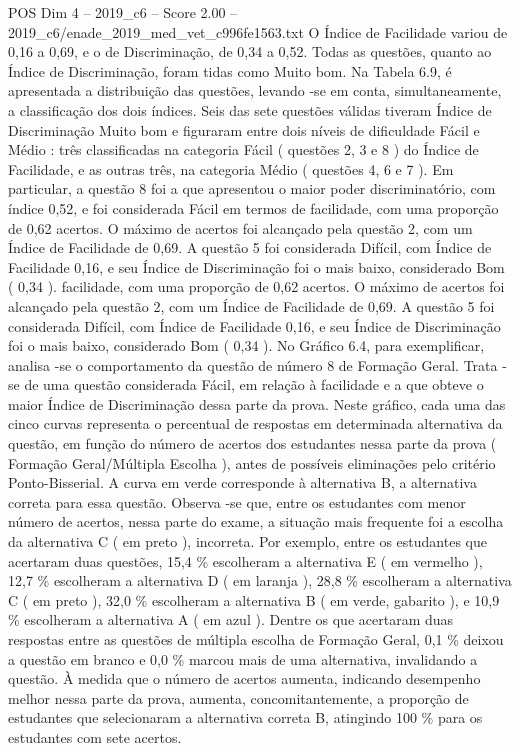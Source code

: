 \begin{textsample}{POS Dim 4 – 2019\_c6 – Score 2.00 – 2019\_c6/enade\_2019\_med\_vet\_c996fe1563.txt}
O Índice de Facilidade variou de 0,16 a 0,69, e o de Discriminação, de 0,34 a 0,52.
Todas as questões, quanto ao Índice de Discriminação, foram tidas como Muito bom.
Na Tabela 6.9, é apresentada a distribuição das questões, levando -se em conta, simultaneamente, a classificação dos dois índices.
Seis das sete questões válidas tiveram Índice de Discriminação Muito bom e figuraram entre dois níveis de dificuldade Fácil e Médio : três classificadas na categoria Fácil ( questões 2, 3 e 8 ) do Índice de Facilidade, e as outras três, na categoria Médio ( questões 4, 6 e 7 ).
Em particular, a questão 8 foi a que apresentou o maior poder discriminatório, com índice 0,52, e foi considerada Fácil em termos de facilidade, com uma proporção de 0,62 acertos.
O máximo de acertos foi alcançado pela questão 2, com um Índice de Facilidade de 0,69.
A questão 5 foi considerada Difícil, com Índice de Facilidade 0,16, e seu Índice de Discriminação foi o mais baixo, considerado Bom ( 0,34 ). facilidade, com uma proporção de 0,62 acertos.
O máximo de acertos foi alcançado pela questão 2, com um Índice de Facilidade de 0,69.
A questão 5 foi considerada Difícil, com Índice de Facilidade 0,16, e seu Índice de Discriminação foi o mais baixo, considerado Bom ( 0,34 ).
No Gráfico 6.4, para exemplificar, analisa -se o comportamento da questão de número 8 de Formação Geral.
Trata -se de uma questão considerada Fácil, em relação à facilidade e a que obteve o maior Índice de Discriminação dessa parte da prova.
Neste gráfico, cada uma das cinco curvas representa o percentual de respostas em determinada alternativa da questão, em função do número de acertos dos estudantes nessa parte da prova ( Formação Geral/Múltipla Escolha ), antes de possíveis eliminações pelo critério Ponto-Bisserial.
A curva em verde corresponde à alternativa B, a alternativa correta para essa questão.
Observa -se que, entre os estudantes com menor número de acertos, nessa parte do exame, a situação mais frequente foi a escolha da alternativa C ( em preto ), incorreta.
Por exemplo, entre os estudantes que acertaram duas questões, 15,4 \% escolheram a alternativa E ( em vermelho ), 12,7 \% escolheram a alternativa D ( em laranja ), 28,8 \% escolheram a alternativa C ( em preto ), 32,0 \% escolheram a alternativa B ( em verde, gabarito ), e 10,9 \% escolheram a alternativa A ( em azul ).
Dentre os que acertaram duas respostas entre as questões de múltipla escolha de Formação Geral, 0,1 \% deixou a questão em branco e 0,0 \% marcou mais de uma alternativa, invalidando a questão.
À medida que o número de acertos aumenta, indicando desempenho melhor nessa parte da prova, aumenta, concomitantemente, a proporção de estudantes que selecionaram a alternativa correta B, atingindo 100 \% para os estudantes com sete acertos.

\end{textsample}
